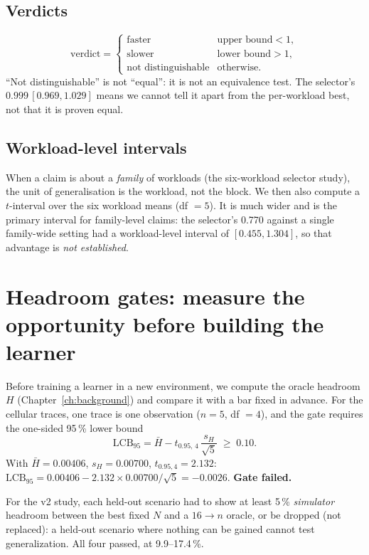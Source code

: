 \subsection{Verdicts}
\begin{equation}
\text{verdict} = \begin{cases}
\text{faster} & \text{upper bound} < 1,\\
\text{slower} & \text{lower bound} > 1,\\
\text{not distinguishable} & \text{otherwise.}
\end{cases}
\end{equation}
``Not distinguishable'' is not ``equal'': it is not an equivalence test. The selector's $0.999\,[0.969, 1.029]$ means we cannot tell it apart from the per-workload best, not that it is proven equal.

\subsection{Workload-level intervals}
When a claim is about a \emph{family} of workloads (the six-workload selector study), the unit of generalisation is the workload, not the block. We then also compute a $t$-interval over the six workload means (df $=5$). It is much wider and is the primary interval for family-level claims: the selector's 0.770 against a single family-wide setting had a workload-level interval of $[0.455, 1.304]$, so that advantage is \emph{not established}.

\section{Headroom gates: measure the opportunity before building the learner}
Before training a learner in a new environment, we compute the oracle headroom $H$ (Chapter~\ref{ch:background}) and compare it with a bar fixed in advance. For the cellular traces, one trace is one observation ($n=5$, df $=4$), and the gate requires the one-sided 95\,\% lower bound
\begin{equation}
\text{LCB}_{95} = \bar H - t_{0.95,\,4}\,\frac{s_H}{\sqrt{5}} \;\ge\; 0.10 .
\end{equation}
With $\bar H = 0.00406$, $s_H = 0.00700$, $t_{0.95,4} = 2.132$: $\text{LCB}_{95} = 0.00406 - 2.132\times0.00700/\sqrt5 = -0.0026$. \textbf{Gate failed.}

For the v2 study, each held-out scenario had to show at least 5\,\% \emph{simulator} headroom between the best fixed $N$ and a $16\to n$ oracle, or be dropped (not replaced): a held-out scenario where nothing can be gained cannot test generalization. All four passed, at 9.9--17.4\,\%.

